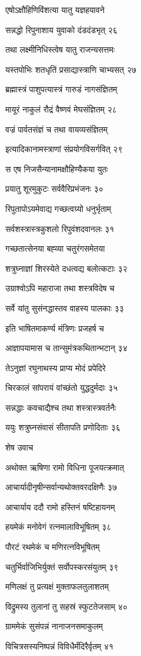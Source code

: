 एषोऽक्षौहिणिविंशत्या यातु यज्ञहयावने

सन्नद्धो रिपुनाशाय युवाको दंडदंडभृत् २६

तथा लक्ष्मीनिधिस्त्वेष यातु राजन्यसत्तमः

यस्तपोभिः शतधृतिं प्रसाद्यास्त्राणि चाभ्यसत् २७

ब्रह्मास्त्रं पाशुपत्यास्त्रं गारुडं नागसंज्ञितम्

मायूरं नाकुलं रौद्रं वैष्णवं मेघसंज्ञितम् २८

वज्रं पार्वतसंज्ञं च तथा वायव्यसंज्ञितम्

इत्यादिकानामस्त्राणां संप्रयोगविसर्गवित् २९

स एष निजसैन्यानामक्षौहिण्यैकया युतः

प्रयातु शूरमुकुटः सर्ववैरिप्रभंजनः ३०

रिपुतापोऽयमेवाद्य गच्छत्वग्र्यो धनुर्भृताम्

सर्वशस्त्रास्त्रकुशलो रिपुवंशदवानलः ३१

गच्छतात्सेनया बह्व्या चतुरंगसमेतया

शत्रुघ्नाज्ञां शिरस्येते दधत्वद्य बलोत्कटाः ३२

उग्राश्वोऽपि महाराजा तथा शस्त्रविदेष च

सर्वे यांतु सुसंनद्धास्तव वाहस्य पालकाः ३३

इति भाषितमाकर्ण्य मंत्रिणः प्रजहर्ष च

आज्ञापयामास च तान्सुमंत्रकथितान्भटान् ३४

तेऽनुज्ञां रघुनाथस्य प्राप्य मोदं प्रपेदिरे

चिरकालं सांपरायं वांच्छंतो युद्धदुर्मदाः ३५

सन्नद्धाः कवचाद्यैश्च तथा शस्त्रास्त्रवर्तनैः

ययुः शत्रुघ्नसंवासं सीतापति प्रणोदिताः ३६

शेष उवाच

अथोक्त ऋषिणा रामो विधिना पूजयत्क्रमात्

आचार्यादीनृषीन्सर्वान्यथोक्तवरदक्षिणैः ३७

आचार्याय ददौ रामो हस्तिनं षष्टिहायनम्

हयमेकं मनोवेगं रत्नमालाविभूषितम् ३८

पौरटं रथमेकं च मणिरत्नविभूषितम्

चतुर्भिर्वाजिभिर्युक्तं सर्वोपस्करसंयुतम् ३९

मणिलक्षं तु प्रत्यक्षं मुक्ताफलतुलाशतम्

विद्रुमस्य तुलानां तु सहस्रं स्फुटतेजसाम् ४०

ग्राममेकं सुसंपन्नं नानाजनसमाकुलम्

विचित्रसस्यनिष्पन्नं विविधैर्मंदिरैर्वृतम् ४१

